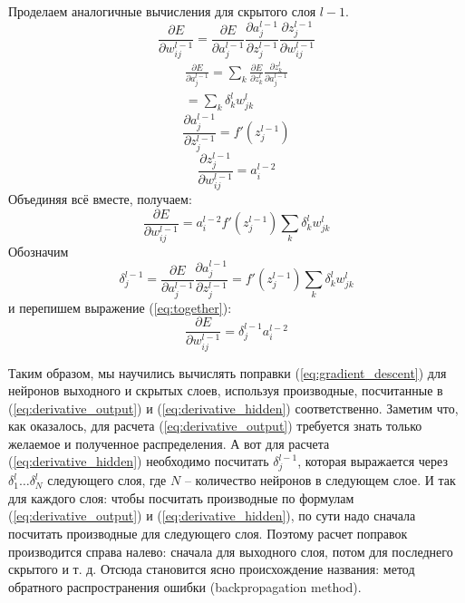 \documentclass[a4paper,12pt]{article}
\theoremstyle{remark}
\begin{document}
	Проделаем аналогичные вычисления для скрытого слоя $l - 1$.
	\begin{equation}
		\frac{\partial E}{\partial w_{ij}^{l-1}} = \frac{\partial E}{\partial a_j^{l-1}} \frac{\partial a_j^{l-1}}{\partial z_j^{l-1}} \frac{\partial z_j^{l-1}}{\partial w_{ij}^{l-1}}
	\end{equation}
	\begin{equation}
		\begin{gathered}
			\frac{\partial E}{\partial a_j^{l-1}} = \sum_k \frac{\partial E}{\partial z_k^l} \frac{\partial z_k^l}{\partial a_j^{l-1}} \\
			= \sum_k \delta_k^l w_{jk}^l
		\end{gathered}
	\end{equation}
	\begin{equation}
		\frac{\partial a_j^{l-1}}{\partial z_j^{l-1}} = f'(z_j^{l-1})
	\end{equation}
	\begin{equation}
		\frac{\partial z_j^{l-1}}{\partial w_{ij}^{l-1}} = a_i^{l-2}
	\end{equation}
	Объединяя всё вместе, получаем:
	\begin{equation}\label{eq:together}
		\frac{\partial E}{\partial w_{ij}^{l-1}} = a_i^{l-2} f'(z_j^{l-1}) \sum_k \delta_k^l w_{jk}^l
	\end{equation}
	Обозначим
	\begin{equation}
		\delta_j^{l-1} = \frac{\partial E}{\partial a_j^{l-1}} \frac{\partial a_j^{l-1}}{\partial z_j^{l-1}} = f'(z_j^{l-1}) \sum_k \delta_k^l w_{jk}^l
	\end{equation}
	и перепишем выражение (\ref{eq:together}):
	\begin{equation}\label{eq:derivative_hidden}
		\frac{\partial E}{\partial w_{ij}^{l-1}} = \delta_j^{l-1} a_i^{l-2}
	\end{equation}
	
	Таким образом, мы научились вычислять поправки (\ref{eq:gradient_descent}) для нейронов выходного и скрытых слоев, используя производные, посчитанные в (\ref{eq:derivative_output}) и (\ref{eq:derivative_hidden}) соответственно. Заметим что, как оказалось, для расчета (\ref{eq:derivative_output}) требуется знать только желаемое и полученное распределения. А вот для расчета (\ref{eq:derivative_hidden}) необходимо посчитать $\delta_j^{l-1}$, которая выражается через $\delta_1^l \dots \delta_N^l$ следующего слоя, где $N$ -- количество нейронов в следующем слое. И так для каждого слоя: чтобы посчитать производные по формулам (\ref{eq:derivative_output}) и (\ref{eq:derivative_hidden}), по сути надо сначала посчитать производные для следующего слоя. Поэтому расчет поправок производится справа налево: сначала для выходного слоя, потом для последнего скрытого и т. д. Отсюда становится ясно происхождение названия: метод обратного распространения ошибки (backpropagation method).
	
\end{document}
